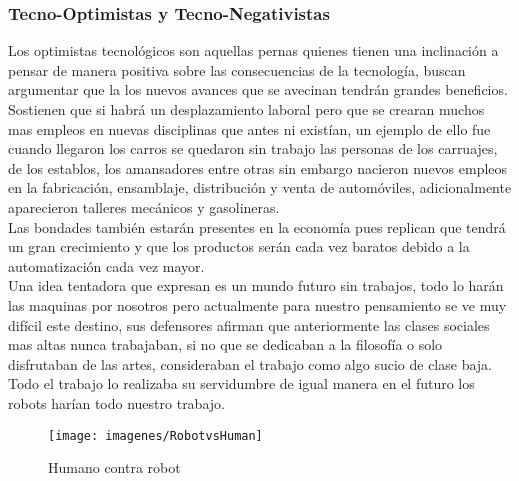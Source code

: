\documentclass[journal]{IEEEtran}
\begin{document}
\subsubsection{Tecno-Optimistas y Tecno-Negativistas}
Los optimistas tecnológicos son aquellas pernas quienes tienen una inclinación a pensar de manera positiva sobre las consecuencias de la tecnología, buscan argumentar que la los nuevos avances que se avecinan tendrán grandes beneficios. Sostienen que si habrá un desplazamiento laboral pero que se crearan muchos mas empleos en nuevas disciplinas que antes ni existían, un ejemplo de ello fue cuando llegaron los carros se quedaron sin trabajo las personas de los carruajes, de los establos, los amansadores entre otras sin embargo nacieron nuevos empleos en la fabricación, ensamblaje, distribución y venta de automóviles, adicionalmente aparecieron talleres mecánicos y gasolineras.\\Las bondades también estarán presentes en la economía pues replican que tendrá un gran crecimiento y que los productos serán cada vez baratos debido a la automatización cada vez mayor.\\Una idea tentadora que expresan es un mundo futuro sin trabajos, todo lo harán las maquinas por nosotros pero actualmente para nuestro pensamiento se ve muy difícil este destino, sus defensores afirman que anteriormente las clases sociales mas altas nunca trabajaban, si no que se dedicaban a la filosofía o solo disfrutaban de las artes, consideraban el trabajo como algo sucio de clase baja. Todo el trabajo lo realizaba su servidumbre de igual manera en el futuro los robots harían todo nuestro trabajo.

\begin{figure}[!b]
\centering
\texttt{[image: imagenes/RobotvsHuman]}
\caption{Humano contra robot}
\label{fig_sim}
\end{figure}
\end{document}
